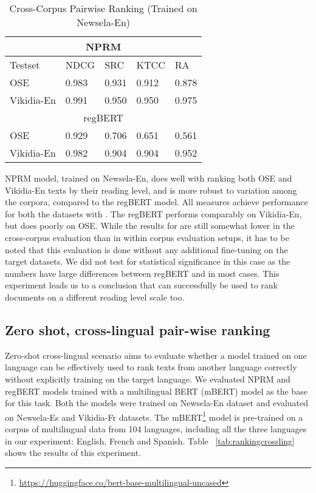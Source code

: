 \documentclass[11pt]{article}
\begin{document}
\begin{table}[htb]
\begin{tabular}{ |p{2.45cm}|p{0.85cm}|p{0.7cm}|p{0.8cm}| p{0.7cm}|}
 \hline 
 \multicolumn{5}{|c|}{NPRM} \\ \hline Testset & NDCG & SRC & KTCC & RA\\
 \hline
 OSE&  0.983 & 0.931 & 0.912 & 0.878\\ 
 \hline
 Vikidia-En & 0.991 & 0.950 & 0.950 & 0.975\\
 \hline
  \multicolumn{5}{|c|}{regBERT} \\ \hline OSE & 0.929 & 0.706 & 0.651 & 0.561\\
 \hline
 Vikidia-En& 0.982 & 0.904 & 0.904 & 0.952\\
 \hline
\end{tabular}
\caption{Cross-Corpus Pairwise Ranking (Trained on Newsela-En)}
\label{tab:rankingcross}
\end{table}

NPRM model, trained on Newsela-En, does well with ranking both OSE and Vikidia-En texts by their reading level, and is more robust to variation among the corpora, compared to the regBERT model. All measures achieve performance  for both the datasets with \textit{}. The regBERT performs comparably on Vikidia-En, but does poorly on OSE. While the results for  are still somewhat lower in the cross-corpus evaluation than in within corpus evaluation setups, it has to be noted that this evaluation is done without any additional fine-tuning on the target datasets. We did not test for statistical significance in this case as the numbers have large differences between regBERT and  in most cases. This experiment leads us to a conclusion that  can successfully be used to rank documents on a different reading level scale too. 

\subsection{Zero shot, cross-lingual pair-wise ranking}
Zero-shot cross-lingual scenario aims to evaluate whether a model trained on one language can be effectively used to rank texts from another language correctly without explicitly training on the target language. We evaluated NPRM and regBERT models trained with a multilingual BERT (mBERT) model as the base for this task. Both the models were trained on Newsela-En dataset and evaluated on Newsela-Es and Vikidia-Fr datasets. The mBERT\footnote{\url{https://huggingface.co/bert-base-multilingual-uncased}} model is pre-trained on a corpus of multilingual data from 104 languages, including all the three languages in our experiment: English, French and Spanish.  Table ~\ref{tab:rankingcrossling} shows the results of this experiment. 
\end{document}
